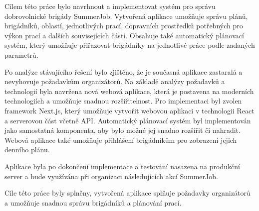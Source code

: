 \begin{conclusion}
	Cílem této práce bylo navrhnout a implementovat systém pro správu dobrovolnické brigády SummerJob.
	Vytvořená aplikace umožňuje správu plánů, brigádníků, oblastí, jednotlivých prací, dopravních prostředků potřebných pro výkon prací a dalších souvisejících částí.
	Obsahuje také automatický plánovací systém, který umožňuje přiřazovat brigádníky na jednotlivé práce podle zadaných parametrů.

	Po analýze stávajícího řešení bylo zjištěno, že je současná aplikace zastaralá a nevyhovuje požadavkům organizátorů.
	Na základě analýzy požadavků a technologií byla navržena nová webová aplikace, která je postavena na moderních technologiích a umožňuje snadnou rozšiřitelnost.
	Pro implementaci byl zvolen framework Next.js, který umožňuje vytvořit webovou aplikaci v technologii React a serverovou část včetně API.
	Automatický plánovací systém byl implementován jako samostatná komponenta, aby bylo možné jej snadno rozšířit či nahradit.
	Webová aplikace také umožňuje přihlášení brigádníkům pro zobrazení jejich denního plánu.

	Aplikace byla po dokončení implementace a testování nasazena na produkční server a bude využívána při organizaci následujících akcí SummerJob.

	Cíle této práce byly splněny, vytvořená aplikace splňuje požadavky organizátorů a umožňuje snadnou správu brigádníků a plánování prací.

\end{conclusion}
